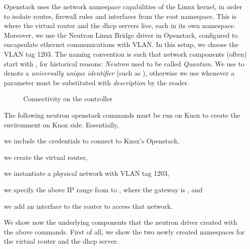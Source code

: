 Openstack uses the network namespace capabilities of the Linux kernel,
in order to isolate routes, firewall rules and interfaces from the
root namespace.
%
This is where the virtual router and the dhcp servers live, each in
its own namespace.
%
Moreover, we use the Neutron Linux Bridge driver in Openstack,
configured to encapsulate ethernet communications with VLAN.
%
In this setup, we choose the VLAN tag 1203.
%
The naming convention is such that network components (often) start
with , for historical reasons: \emph{Neutron} used to be
called \emph{Quantum}. We use \codeline{\uuid}
to denote a \emph{universally unique identifier} (such as
), otherwise we use
 whenever a
parameter must be substituted with \emph{description} by the reader.

\begin{figure}[ht]%
  \centering
  
  \caption{Connectivity on the controller}
  \label{figure:connectivity:controller}
\end{figure}


The following neutron openstack commands must be run on Knox
 to create the environment on Knox side.
%
Essentially,
\begin{dazenumerate}
\item we include the credentials to connect to Knox's Openstack,
\item we create the virtual router,
\item we instantiate a physical network with VLAN tag 1203,
\item we specify the above IP range from  to
  , where the gateway is , and
\item we add an interface to the router to access that network.
\end{dazenumerate}


We show now the underlying components that the neutron driver created
with the above commands.
%
First of all, we show
the two newly created
namespaces %
for the virtual router and the dhcp server. %


